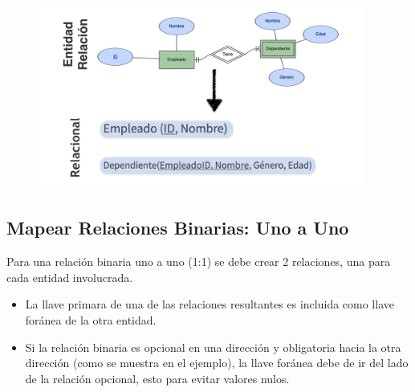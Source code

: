 \documentclass[12pt, fleqn]{report}                             %
\theoremstyle{break}                                            %
\begin{document}
                \begin{figure}[h]
                    \centering
                    \includegraphics[width=0.95\textwidth]{MapeoEntidadDebil}
                \end{figure}



            \clearpage
            \subsection{Mapear Relaciones Binarias: Uno a Uno}

                Para una relación binaria uno a uno (1:1) se debe crear 2 relaciones, una para cada entidad
                involucrada.

                \begin{itemize}
                    \item 
                        La llave primara de una de las relaciones resultantes es incluida como llave
                        foránea de la otra entidad.
                    \item
                        Si la relación binaria es opcional en una dirección y obligatoria hacia la otra dirección
                        (como se muestra en el ejemplo), la llave foránea debe de ir del lado de la relación
                        opcional, esto para evitar valores nulos.
                \end{itemize}
\end{document}
